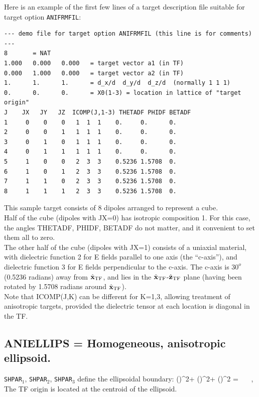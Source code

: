         Here is an example of the first few lines of a target description
        file suitable for target option {\tt ANIFRMFIL}:

{\footnotesize
\begin{verbatim}
--- demo file for target option ANIFRMFIL (this line is for comments) ---
8       = NAT
1.000   0.000   0.000   = target vector a1 (in TF)
0.000   1.000   0.000   = target vector a2 (in TF)
1.      1.      1.      = d_x/d  d_y/d  d_z/d  (normally 1 1 1)
0.      0.      0.      = X0(1-3) = location in lattice of "target origin"
J    JX   JY   JZ  ICOMP(J,1-3) THETADF PHIDF BETADF
1     0    0    0   1  1  1    0.     0.      0.
2     0    0    1   1  1  1    0.     0.      0.
3     0    1    0   1  1  1    0.     0.      0.
4     0    1    1   1  1  1    0.     0.      0.
5     1    0    0   2  3  3    0.5236 1.5708  0.
6     1    0    1   2  3  3    0.5236 1.5708  0.
7     1    1    0   2  3  3    0.5236 1.5708  0.
8     1    1    1   2  3  3    0.5236 1.5708  0.
\end{verbatim}}

This sample target consists of 8 dipoles arranged to represent a cube.\\
Half of the cube (dipoles with JX=0) has isotropic composition 1.  
For this case,
the angles THETADF, PHIDF, BETADF do not matter, and it convenient to
set them all to zero.\\
The other half of the cube (dipoles with JX=1) 
consists of a uniaxial material, with dielectric
function 2 for E fields parallel to one axis (the ``c-axis''), 
and dielectric function 3 for E fields perpendicular
to the c-axis. The c-axis is
$30^o$ (0.5236 radians) away from $\hat{\bf x}_{\rm TF}$, 
and lies in the $\hat{\bf x}_{\rm TF}$-$\hat{\bf z}_{\rm TF}$ plane (having been
rotated by 1.5708 radians around $\hat{\bf x}_{\rm TF}$).\\
Note that ICOMP(J,K) can be different for K=1,3, allowing treatment
of anisotropic targets, provided the dielectric tensor at each location
is diagonal in the TF.

\subsection{ ANIELLIPS =  Homogeneous, anisotropic ellipsoid.
         \label{sec:ANIELLIPS}}
	{\tt SHPAR$_1$}, {\tt SHPAR$_2$},
	{\tt SHPAR}$_3$ define the ellipsoidal boundary:
\beq
	\left(\right)^2+
        \left(\right)^2+
        \left(\right)^2 = 
        ~~~,
\eeq
The TF origin is located at the centroid of the ellipsoid.
